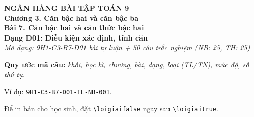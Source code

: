 \documentclass[12pt,a4paper]{article}
\newif\ifloigiai
\begin{document}
\begin{center}
{\Large\textbf{NGÂN HÀNG BÀI TẬP TOÁN 9}}\\[3pt]
\textbf{Chương 3. Căn bậc hai và căn bậc ba}\\[2pt]
\textbf{Bài 7. Căn bậc hai và căn thức bậc hai}\\[2pt]
\textbf{Dạng D01: Điều kiện xác định, tính căn}\\[2pt]
\textit{Mã dạng: 9H1-C3-B7-D01  bài tự luận + 50 câu trắc nghiệm \quad (NB: 25, TH: 25)}
\end{center}
\textbf{Quy ước mã câu:} \textit{khối, học kì, chương, bài, dạng, loại (TL/TN), mức độ, số thứ tự}.\par Ví dụ: \texttt{9H1-C3-B7-D01-TL-NB-001}.\par Để in bản cho học sinh, đặt \verb|\loigiaifalse| ngay sau \verb|\loigiaitrue|.
\end{document}
